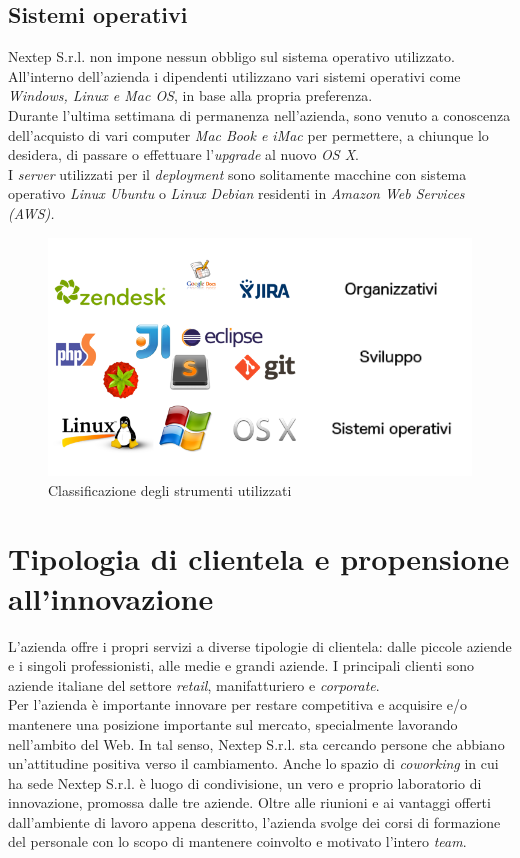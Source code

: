 \subsection*{Sistemi operativi}
Nextep S.r.l. non impone nessun obbligo sul sistema operativo utilizzato. All'interno dell'azienda i dipendenti utilizzano vari sistemi operativi come \textit{Windows, Linux e Mac OS}, in base alla propria preferenza.\\
Durante l'ultima settimana di permanenza nell'azienda, sono venuto a conoscenza dell'acquisto di vari computer \textit{Mac Book e iMac }per permettere, a chiunque lo desidera, di passare o effettuare l'\textit{upgrade }al nuovo \textit{OS X}.\\
I \textit{server }utilizzati per il \textit{deployment }sono solitamente macchine con sistema operativo \textit{Linux Ubuntu} o \textit{Linux Debian} residenti in \textit{Amazon Web Services (AWS).}

\begin{figure}[h]
\centering
\includegraphics[width=0.7\linewidth]{immagini/gestione}
\caption[Classificazione degli strumenti utilizzati]{Classificazione degli strumenti utilizzati}
\label{fig:gestione}
\end{figure}

\section{Tipologia di clientela e propensione all'innovazione}
L'azienda offre i propri servizi a diverse tipologie di clientela: dalle piccole aziende e i singoli professionisti, alle medie e grandi aziende. I principali clienti sono aziende italiane del settore \textit{retail}, manifatturiero e \textit{corporate}. \\
Per l'azienda è importante innovare per restare competitiva e acquisire e/o mantenere una posizione importante sul mercato, specialmente lavorando nell'ambito del Web. In tal senso, Nextep S.r.l. sta cercando persone che abbiano un'attitudine positiva verso il cambiamento. Anche lo spazio di \textit{coworking} in cui ha sede Nextep S.r.l. è luogo di condivisione, un vero e proprio laboratorio di innovazione, promossa dalle tre aziende. Oltre alle riunioni e ai vantaggi offerti dall'ambiente di lavoro appena descritto, l'azienda svolge dei corsi di formazione del personale con lo scopo di mantenere coinvolto e motivato l'intero \textit{team}.